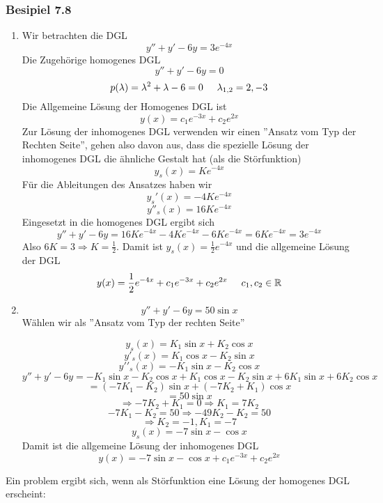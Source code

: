 \subsubsection*{Besipiel 7.8}
\begin{enumerate}
\item Wir betrachten die DGL $$y''+y'-6y=3e^{-4x}$$Die Zugehörige homogenes DGL $$y''+y'-6y=0$$$$p(\lambda)=\lambda^2+\lambda-6=0\text{\hspace{5mm}}\lambda_{1,2}=2,-3$$ Die Allgemeine Lösung der Homogenes DGL ist $$y(x)=c_1e^{-3x}+c_2e^{2x}$$ Zur Lösung der inhomogenes DGL verwenden wir einen ''Ansatz vom Typ der Rechten Seite'', gehen also davon aus, dass die spezielle Lösung der inhomogenes DGL die ähnliche Gestalt hat (als die Störfunktion) $$y_s(x)=Ke^{-4x}$$Für die Ableitungen des Ansatzes haben wir $$y_s'(x)=-4Ke^{-4x}$$$$y''_s(x)=16Ke^{-4x}$$Eingesetzt in die homogenes DGL ergibt sich $$y''+y'-6y=16Ke^{-4x}-4Ke^{-4x}-6Ke^{-4x}=6Ke^{-4x}=3e^{-4x}$$Also $6K=3\Rightarrow K=\frac{1}{2}$. Damit ist $y_s(x)=\frac{1}{2}e^{-4x}$ und die allgemeine Lösung der DGL $$y(x)=\frac{1}{2}e^{-4x}+c_1e^{-3x}+c_2e^{2x}\text{\hspace{5mm}}c_1,c_2\in\mathbb{R}$$
\item $$y''+y'-6y=50\sin x$$ Wählen wir als ''Ansatz vom Typ der rechten Seite''

$${y_s}(x) = {K_1}\sin x + {K_2}\cos x$$
$$y{'_s}(x) = {K_1}\cos x - {K_2}\sin x$$
$$y'{'_s}(x) =  - {K_1}\sin x - {K_2}\cos x$$
$$y'' + y' - 6y =  - {K_1}\sin x - {K_2}\cos x + {K_1}\cos x - {K_2}\sin x + 6{K_1}\sin x + 6{K_2}\cos x$$
$$ = ( - 7{K_1} - {K_2})\sin x + ( - 7{K_2} + {K_1})\cos x$$
$$ = 50\sin x$$
$$ \Rightarrow  - 7{K_2} + {K_1} = 0 \Rightarrow {K_1} = 7{K_2}$$
$$ - 7{K_1} - {K_2} = 50 \Rightarrow  - 49{K_2} - {K_2} = 50$$
$$ \Rightarrow {K_2} =  - 1,{K_1} =  - 7$$
$$y_s(x)=-7\sin x-\cos x$$
Damit ist die allgemeine Lösung der inhomogenes DGL $$y(x)=-7\sin x-\cos x+c_1e^{-3x}+c_2e^{2x}$$
\end{enumerate}
Ein problem ergibt sich, wenn als Störfunktion eine Lösung der homogenes DGL erscheint:

